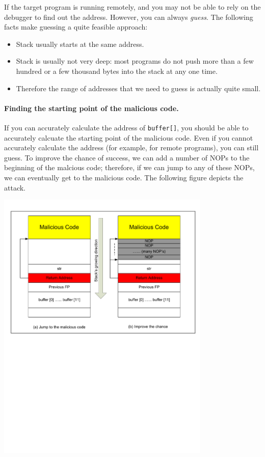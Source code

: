 If the target program is running remotely, and you may not be able to
rely on the debugger to find out the address. However, you can always
{\em guess}. The following facts make guessing a quite feasible approach:
      \begin{itemize}
      \item Stack usually starts at the same address.
      \item Stack is usually not very deep: most programs do not push more than
            a few hundred or a few thousand bytes into the stack at any one time.
      \item Therefore the range of addresses that we need to guess is actually
            quite small.
      \end{itemize}



\paragraph{Finding the starting point of the malicious code.}
If you can accurately calculate the address of {\tt buffer[]}, you should be 
able to accurately calcuate the starting point of the malicious code.
Even if you cannot accurately calculate the address (for example, for remote programs),
you can still guess. To improve the chance of success, we can add a
number of NOPs to the beginning of the malcious code; therefore, if we 
can jump to any of these NOPs, we can eventually get to the 
malicious code. The following figure depicts the attack.


\begin{center}
\includegraphics*[viewport=0.25in 5.2in 8.30in 10.55in,width=4.0in,natwidth=621,natheight=403]{Figs/buffer_overflow_jump_to_malicious_code.pdf}
\end{center}


